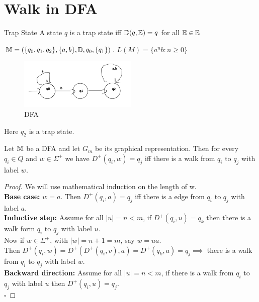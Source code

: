 
\section{Walk in DFA}

\begin{definition}{Trap State}
    A state $q$ is a trap state iff $ \mathbb{D}(q, \mathbb{E}) = q $ for all $\mathbb{E} \in \mathbb{E}$
\end{definition}

\begin{example}
    $ \mathbb{M} = ( \{q_0, q_1, q_2\} , \{a, b\} , \mathbb{D}, q_0, \{q_1\} ) $. $L(M) = \{a^nb : n \geq 0\} $
\end{example}

\begin{figure}[!h]
    \centering
    \includegraphics[width=0.5\textwidth]{figures/lec04_01.png}
    \caption{DFA}
\end{figure}

Here $q_2$ is a trap state.

\begin{theorem}{}
    Let $\mathbb{M}$ be a DFA and let $G_m$ be its graphical representation. Then for every $q_i \in Q$ and $w \in \Sigma^{+}$ we have $D^{+}(q_i, w) = q_j$ iff there is a walk from $q_i$ to $q_j$ with label $w$.
\end{theorem}

\begin{proof}
    We will use mathematical induction on the length of w.\\
    \textbf{Base case:} $w = a$. Then $D^{+}(q_i, a) = q_j$ iff there is a edge from $q_i$ to $q_j$ with label $a$. \\
    \textbf{Inductive step:} Assume for all $\left| u \right| = n < m$, if $D^{+}(q_i, u) = q_k$ then there is a walk form $q_i$ to $q_j$ with label $u$. \\ 
    Now if $w \in \Sigma^{+}$, with $\left| w \right| = n+1 = m$, say $w = ua$. \\ 
    Then $D^{+}(q_i, w) = D^{+}(D^{+}(q_i, v), a) = D^{+}(q_k, a) = q_j \implies$ there is a walk from $q_i$ to $q_j$ with label $w$. \\

    \textbf{Backward direction:} Assume for all $\left| u \right| = n < m$, if there is a walk from $q_i$ to $q_j$ with label $u$ then $D^{+}(q_i, u) = q_j$. \\
    $\square$   
\end{proof}

